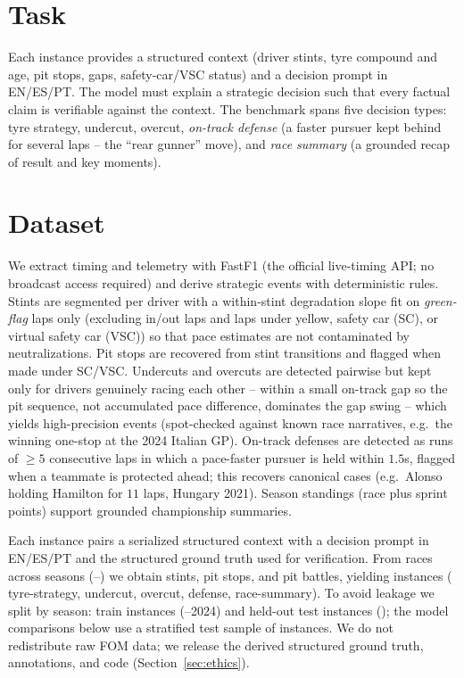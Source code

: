 \documentclass[11pt]{article}
\begin{document}
\section{Task}\label{sec:task}
Each instance provides a structured context (driver stints, tyre compound and
age, pit stops, gaps, safety-car/VSC status) and a decision prompt in EN/ES/PT.
The model must explain a strategic decision such that every factual claim is
verifiable against the context. The benchmark spans five decision types: tyre
strategy, undercut, overcut, \emph{on-track defense} (a faster pursuer kept behind
for several laps -- the ``rear gunner'' move), and \emph{race summary} (a grounded
recap of result and key moments).

\section{Dataset}\label{sec:data}
We extract timing and telemetry with FastF1 \citep{fastf1} (the official live-timing
API; no broadcast access required) and derive strategic events with deterministic
rules. Stints are segmented per driver with a within-stint degradation slope fit on
\emph{green-flag} laps only (excluding in/out laps and laps under yellow, safety car
(SC), or virtual safety car (VSC)) so that pace estimates are not contaminated by
neutralizations. Pit stops are recovered from stint transitions and flagged when made
under SC/VSC. Undercuts and overcuts are detected pairwise but kept only for drivers
genuinely racing each other -- within a small on-track gap so the pit sequence, not
accumulated pace difference, dominates the gap swing -- which yields high-precision
events (spot-checked against known race narratives, e.g.\ the winning one-stop at the
2024 Italian GP). On-track defenses are detected as runs of $\geq 5$ consecutive laps
in which a pace-faster pursuer is held within $1.5$s, flagged when a teammate is
protected ahead; this recovers canonical cases (e.g.\ Alonso holding Hamilton for
$11$ laps, Hungary 2021). Season standings (race plus sprint points) support grounded
championship summaries.

Each instance pairs a serialized structured context with a decision prompt in EN/ES/PT
and the structured ground truth used for verification. From \FOneNumRaces{} races
across \FOneNumSeasons{} seasons (\FOneFirstSeason{}--\FOneLastSeason{}) we obtain
\FOneNumStints{} stints, \FOneNumPits{} pit stops, and \FOneNumBattles{} pit battles,
yielding \FOneNumInstances{} instances (\FOneNumStint{} tyre-strategy,
\FOneNumUndercut{} undercut, \FOneNumOvercut{} overcut, \FOneNumDefense{} defense,
\FOneNumRaceSummary{} race-summary). To avoid leakage we split by
season: \FOneNumTrain{} train instances (\FOneFirstSeason{}--2024) and \FOneNumTest{}
held-out test instances (\FOneLastSeason{}); the model comparisons below use a
stratified test sample of \FOneNumTestSample{} instances. We do not redistribute raw
FOM data; we release the derived structured ground truth, annotations, and code
(Section~\ref{sec:ethics}).
\end{document}
